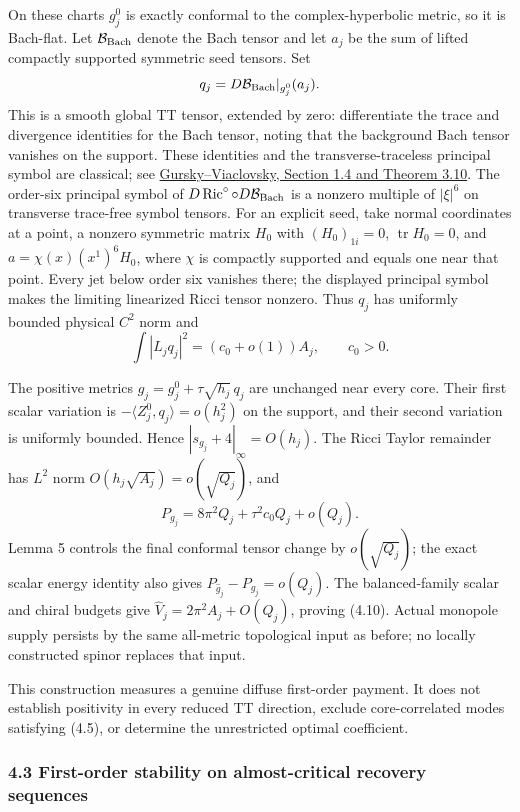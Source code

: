 \documentclass[
  11pt,
]{article}
\begin{document}
On these charts \(g_j^0\) is exactly conformal to the complex-hyperbolic
metric, so it is Bach-flat. Let \(\mathcal B_{\rm Bach}\) denote the
Bach tensor and let \(a_j\) be the sum of lifted compactly supported
symmetric seed tensors. Set \[
 q_j=D\mathcal B_{\rm Bach}|_{g_j^0}(a_j).
\] This is a smooth global TT tensor, extended by zero: differentiate
the trace and divergence identities for the Bach tensor, noting that the
background Bach tensor vanishes on the support. These identities and the
transverse-traceless principal symbol are classical; see
\href{https://arxiv.org/pdf/1105.4648}{Gursky--Viaclovsky, Section 1.4
and Theorem 3.10}. The order-six principal symbol of
\(D\operatorname{Ric}^{\circ}\circ D\mathcal B_{\rm Bach}\) is a nonzero
multiple of \(|\xi|^6\) on transverse trace-free symbol tensors. For an
explicit seed, take normal coordinates at a point, a nonzero symmetric
matrix \(H_0\) with \((H_0)_{1i}=0\), \(\operatorname{tr}H_0=0\), and
\(a=\chi(x)(x^1)^6H_0\), where \(\chi\) is compactly supported and
equals one near that point. Every jet below order six vanishes there;
the displayed principal symbol makes the limiting linearized Ricci
tensor nonzero. Thus \(q_j\) has uniformly bounded physical \(C^2\) norm
and \[
 \int|L_jq_j|^2=(c_0+o(1))A_j,\qquad c_0>0.
\]

The positive metrics \(g_j=g_j^0+\tau\sqrt{h_j}\,q_j\) are unchanged
near every core. Their first scalar variation is
\(-\langle Z_j^0,q_j\rangle=o(h_j^2)\) on the support, and their second
variation is uniformly bounded. Hence \(|s_{g_j}+4|_\infty=O(h_j)\). The
Ricci Taylor remainder has \(L^2\) norm
\(O(h_j\sqrt{A_j})=o(\sqrt{Q_j})\), and \[
 P_{g_j}=8\pi^2Q_j+\tau^2c_0Q_j+o(Q_j).
\] Lemma 5 controls the final conformal tensor change by
\(o(\sqrt{Q_j})\); the exact scalar energy identity also gives
\(P_{\widehat g_j}-P_{g_j}=o(Q_j)\). The balanced-family scalar and
chiral budgets give \(\widehat V_j=2\pi^2A_j+O(Q_j)\), proving (4.10).
Actual monopole supply persists by the same all-metric topological input
as before; no locally constructed spinor replaces that input.

This construction measures a genuine diffuse first-order payment. It
does not establish positivity in every reduced TT direction, exclude
core-correlated modes satisfying (4.5), or determine the unrestricted
optimal coefficient.

\hypertarget{first-order-stability-on-almost-critical-recovery-sequences}{%
\subsubsection{4.3 First-order stability on almost-critical recovery
sequences}\label{first-order-stability-on-almost-critical-recovery-sequences}}
\end{document}
